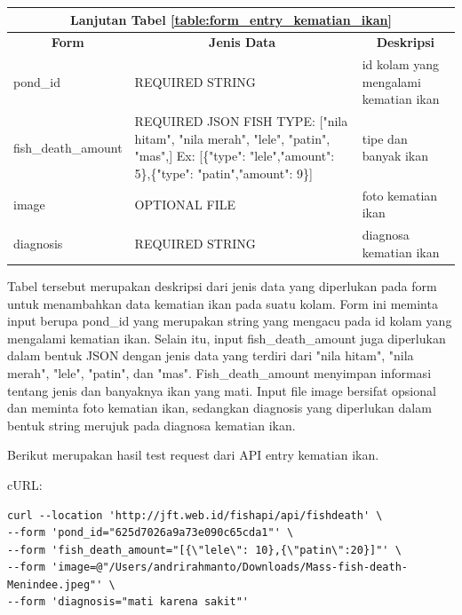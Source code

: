 \begin{enumerate}[1.]
\begin{longtable}{| l | p{5cm} | p{5cm} |}
\hline
\multicolumn{3}{|c|}{Lanjutan Tabel \ref{table:form_entry_kematian_ikan}}\\
\hline
\multicolumn{1}{|c|}{\textbf{Form}} & \multicolumn{1}{|c|}{\textbf{Jenis Data}} & \multicolumn{1}{|c|}{\textbf{Deskripsi}}\\
\hline
\endhead

                                          

pond\_id            & REQUIRED STRING                                                                                                                                             & id kolam yang mengalami kematian ikan \\ \hline
fish\_death\_amount & REQUIRED JSON FISH TYPE: {[}"nila hitam", "nila merah", "lele", "patin", "mas",{]} Ex: {[}\{"type": "lele","amount": 5\},\{"type": "patin","amount": 9\}{]} & tipe dan banyak ikan                  \\ \hline
image               & OPTIONAL FILE                                                                                                                                               & foto kematian ikan                    \\ \hline
diagnosis           & REQUIRED STRING                                                                                                                                             & diagnosa kematian ikan                \\ \hline

\end{longtable}


Tabel tersebut merupakan deskripsi dari jenis data yang diperlukan pada form untuk menambahkan data kematian ikan pada suatu kolam. Form ini meminta input berupa pond\_id yang merupakan string yang mengacu pada id kolam yang mengalami kematian ikan. Selain itu, input fish\_death\_amount juga diperlukan dalam bentuk JSON dengan jenis data yang terdiri dari "nila hitam", "nila merah", "lele", "patin", dan "mas". Fish\_death\_amount menyimpan informasi tentang jenis dan banyaknya ikan yang mati. Input file image bersifat opsional dan meminta foto kematian ikan, sedangkan diagnosis yang diperlukan dalam bentuk string merujuk pada diagnosa kematian ikan.

Berikut merupakan hasil test request dari API entry kematian ikan.

cURL:

\begin{lstlisting}
curl --location 'http://jft.web.id/fishapi/api/fishdeath' \
--form 'pond_id="625d7026a9a73e090c65cda1"' \
--form 'fish_death_amount="[{\"lele\": 10},{\"patin\":20}]"' \
--form 'image=@"/Users/andrirahmanto/Downloads/Mass-fish-death-Menindee.jpeg"' \
--form 'diagnosis="mati karena sakit"'
\end{lstlisting}


\end{enumerate}
